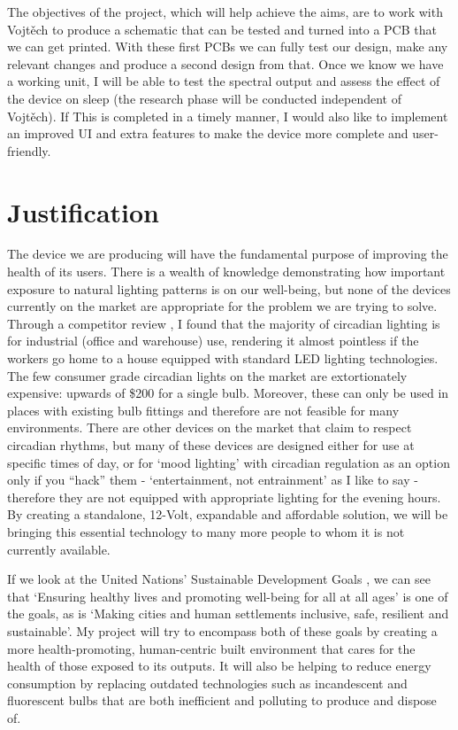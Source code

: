 \documentclass[twoside,twocolumn]{article}
\begin{document}
The objectives of the project, which will help achieve the aims, are to work with Vojtěch to produce a schematic that can be tested and turned into a PCB that we can get printed. With these first PCBs we can fully test our design, make any relevant changes and produce a second design from that. Once we know we have a working unit, I will be able to test the spectral output and assess the effect of the device on sleep (the research phase will be conducted independent of Vojtěch). If This is completed in a timely manner, I would also like to implement an improved UI and extra features to make the device more complete and user-friendly.



\section{Justification}
\label{sec:just}

The device we are producing will have the fundamental purpose of improving the health of its users. There is a wealth of knowledge demonstrating how important exposure to natural lighting patterns is on our well-being, but none of the devices currently on the market are appropriate for the problem we are trying to solve. Through a competitor review \citep{appletonCompetitorAnalysis2020}, I found that the majority of circadian lighting is for industrial (office and warehouse) use, rendering it almost pointless if the workers go home to a house equipped with standard LED lighting technologies. The few consumer grade circadian lights on the market are extortionately expensive: upwards of \$200 for a single bulb. Moreover, these can only be used in places with existing bulb fittings and therefore are not feasible for many environments. There are other devices on the market that claim to respect circadian rhythms, but many of these devices are designed either for use at specific times of day, or for `mood lighting' with circadian regulation as an option only if you ``hack'' them  - `entertainment, not entrainment' as I like to say - therefore they are not equipped with appropriate lighting for the evening hours. By creating a standalone, 12-Volt, expandable and affordable solution, we will be bringing this essential technology to many more people to whom it is not currently available.

If we look at the United Nations' Sustainable Development Goals \citep{un-desaSustainableDevelopmentGoals2016}, we can see that `Ensuring healthy lives and promoting well-being for all at all ages' is one of the goals, as is `Making cities and human settlements inclusive, safe, resilient and sustainable'. My project will try to encompass both of these goals by creating a more health-promoting, human-centric built environment that cares for the health of those exposed to its outputs. It will also be helping to reduce energy consumption by replacing outdated technologies such as incandescent and fluorescent bulbs that are both inefficient and polluting to produce and dispose of.
\end{document}
